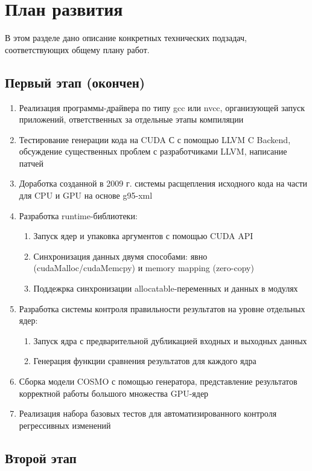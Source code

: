 \documentclass[a4,12pt]{report}
\begin{document}
\chapter{План развития}

В этом разделе дано описание конкретных технических подзадач, соответствующих общему плану работ.

\section{Первый этап (окончен)}

\begin{enumerate}
\item Реализация программы-драйвера по типу gcc или nvcc, организующей запуск приложений, ответственных за отдельные этапы компиляции
\item Тестирование генерации кода на CUDA С с помощью LLVM C Backend, обсуждение существенных проблем с разработчиками LLVM, написание патчей
\item Доработка созданной в 2009 г. системы расщепления исходного кода на части для CPU и GPU на основе g95-xml
\item Разработка runtime-библиотеки:
\begin{enumerate}
\item Запуск ядер и упаковка аргументов с помощью CUDA API
\item Синхронизация данных двумя способами: явно (cudaMalloc/cudaMemcpy) и memory mapping (zero-copy)
\item Поддежрка синхронизации allocatable-переменных и данных в модулях
\end{enumerate}
\item Разработка системы контроля правильности результатов на уровне отдельных ядер:
\begin{enumerate}
\item Запуск ядра с предварительной дубликацией входных и выходных данных
\item Генерация функции сравнения результатов для каждого ядра
\end{enumerate}
\item Сборка модели COSMO с помощью генератора, представление результатов корректной работы большого множества GPU-ядер
\item Реализация набора базовых тестов для автоматизированного контроля регрессивных изменений
\end{enumerate}

\section{Второй этап}
\end{document}
